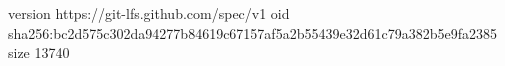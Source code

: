 version https://git-lfs.github.com/spec/v1
oid sha256:bc2d575c302da94277b84619c67157af5a2b55439e32d61c79a382b5e9fa2385
size 13740
